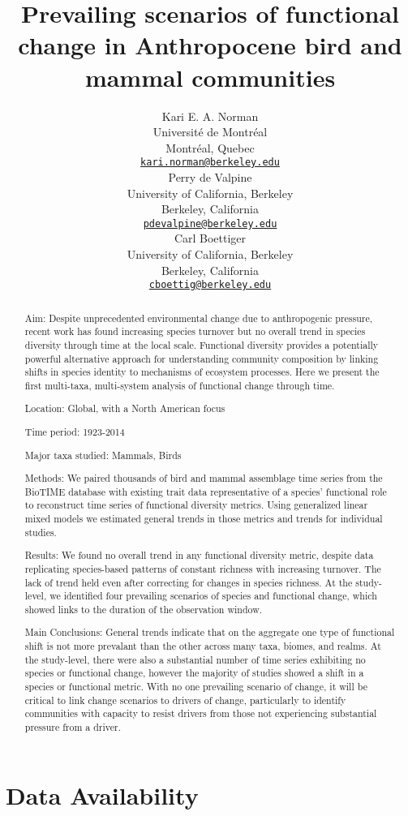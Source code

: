 \documentclass{article}
\title{Prevailing scenarios of functional change in Anthropocene bird
and mammal communities}
\author{
    Kari E. A. Norman
   \\
    Université de Montréal \\
  Montréal, Quebec \\
  \texttt{\href{mailto:kari.norman@berkeley.edu}{\nolinkurl{kari.norman@berkeley.edu}}} \\
   \And
    Perry de Valpine
   \\
    University of California, Berkeley \\
  Berkeley, California \\
  \texttt{\href{mailto:pdevalpine@berkeley.edu}{\nolinkurl{pdevalpine@berkeley.edu}}} \\
   \And
    Carl Boettiger
   \\
    University of California, Berkeley \\
  Berkeley, California \\
  \texttt{\href{mailto:cboettig@berkeley.edu}{\nolinkurl{cboettig@berkeley.edu}}} \\
  }
\begin{document}
\maketitle


\begin{abstract}
Aim: Despite unprecedented environmental change due to anthropogenic
pressure, recent work has found increasing species turnover but no
overall trend in species diversity through time at the local scale.
Functional diversity provides a potentially powerful alternative
approach for understanding community composition by linking shifts in
species identity to mechanisms of ecosystem processes. Here we present
the first multi-taxa, multi-system analysis of functional change through
time.

Location: Global, with a North American focus

Time period: 1923-2014

Major taxa studied: Mammals, Birds

Methods: We paired thousands of bird and mammal assemblage time series
from the BioTIME database with existing trait data representative of a
species' functional role to reconstruct time series of functional
diversity metrics. Using generalized linear mixed models we estimated
general trends in those metrics and trends for individual studies.

Results: We found no overall trend in any functional diversity metric,
despite data replicating species-based patterns of constant richness
with increasing turnover. The lack of trend held even after correcting
for changes in species richness. At the study-level, we identified four
prevailing scenarios of species and functional change, which showed
links to the duration of the observation window.

Main Conclusions: General trends indicate that on the aggregate one type
of functional shift is not more prevalant than the other across many
taxa, biomes, and realms. At the study-level, there were also a
substantial number of time series exhibiting no species or functional
change, however the majority of studies showed a shift in a species or
functional metric. With no one prevailing scenario of change, it will be
critical to link change scenarios to drivers of change, particularly to
identify communities with capacity to resist drivers from those not
experiencing substantial pressure from a driver.
\end{abstract}


\hypertarget{data-availability}{%
\section{Data Availability}\label{data-availability}}
\end{document}
